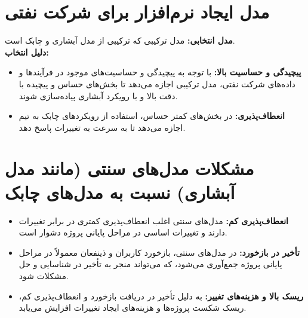 \section*{ مدل ایجاد نرم‌افزار برای شرکت نفتی}
\textbf{مدل انتخابی:}
مدل ترکیبی
که ترکیبی از مدل آبشاری و چابک است. \\
\textbf{دلیل انتخاب:} \\
\begin{itemize}
	\item \textbf{پیچیدگی و حساسیت بالا:} با توجه به پیچیدگی و حساسیت‌های موجود در فرآیندها و داده‌های شرکت نفتی، مدل ترکیبی اجازه می‌دهد تا بخش‌های حساس و پیچیده با دقت بالا و با رویکرد آبشاری پیاده‌سازی شوند.
	\item \textbf{انعطاف‌پذیری:} در بخش‌های کمتر حساس، استفاده از رویکردهای چابک به تیم اجازه می‌دهد تا به سرعت به تغییرات پاسخ دهد.
\end{itemize}

\section*{ مشکلات مدل‌های سنتی (مانند مدل آبشاری) نسبت به مدل‌های چابک}
\begin{itemize}
	\item \textbf{انعطاف‌پذیری کم:} مدل‌های سنتی اغلب انعطاف‌پذیری کمتری در برابر تغییرات دارند و تغییرات اساسی در مراحل پایانی پروژه دشوار است.
	\item \textbf{تأخیر در بازخورد:} در مدل‌های سنتی، بازخورد کاربران و ذینفعان معمولاً در مراحل پایانی پروژه جمع‌آوری می‌شود، که می‌تواند منجر به تأخیر در شناسایی و حل مشکلات شود.
	\item \textbf{ریسک بالا و هزینه‌های تغییر:} به دلیل تأخیر در دریافت بازخورد و انعطاف‌پذیری کم، ریسک شکست پروژه‌ها و هزینه‌های ایجاد تغییرات افزایش می‌یابد.
\end{itemize}